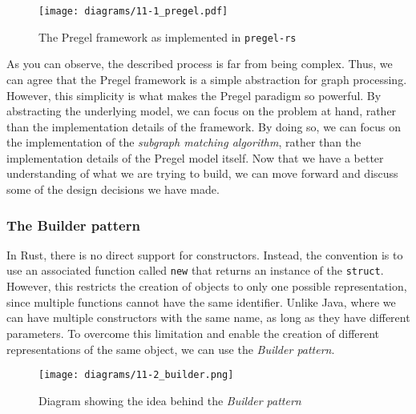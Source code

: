 \begin{figure}[ht]
    \centering
    \texttt{[image: diagrams/11-1\_pregel.pdf]}
    \caption{The Pregel framework as implemented in \texttt{pregel-rs}}
    \label{fig:sequence}
\end{figure}

As you can observe, the described process is far from being complex. Thus, we can agree that the Pregel framework is a simple abstraction for graph processing. However, this simplicity is what makes the Pregel paradigm so powerful. By abstracting the underlying model, we can focus on the problem at hand, rather than the implementation details of the framework. By doing so, we can focus on the implementation of the \textit{subgraph matching algorithm}, rather than the implementation details of the Pregel model itself. Now that we have a better understanding of what we are trying to build, we can move forward and discuss some of the design decisions we have made.

\subsubsection{The Builder pattern}

In Rust, there is no direct support for constructors. Instead, the convention is to use an associated function called \texttt{new} that returns an instance of the \texttt{struct}. However, this restricts the creation of objects to only one possible representation, since multiple functions cannot have the same identifier. Unlike Java, where we can have multiple constructors with the same name, as long as they have different parameters. To overcome this limitation and enable the creation of different representations of the same object, we can use the \textit{Builder pattern}.

\begin{figure}[ht]
    \centering
    \texttt{[image: diagrams/11-2\_builder.png]}
    \caption[Diagram showing the idea behind the \textit{Builder pattern}]{Diagram showing the idea behind the \textit{Builder pattern}\footnotemark}
\end{figure}

